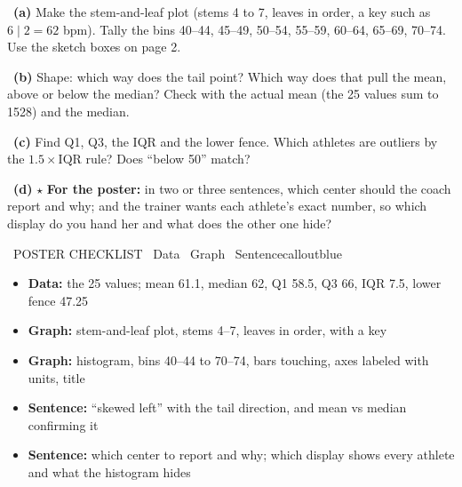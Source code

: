~\textbf{(a)} Make the stem-and-leaf plot (stems 4 to 7, leaves in order, a key such as $6 \mid 2 = 62$ bpm). Tally the bins 40--44, 45--49, 50--54, 55--59, 60--64, 65--69, 70--74. Use the sketch boxes on page 2.
\workspace{1.25in}

~\textbf{(b)} Shape: which way does the tail point? Which way does that pull the mean, above or below the median? Check with the actual mean (the 25 values sum to 1528) and the median.
\workspace{0.8in}

~\textbf{(c)} Find Q1, Q3, the IQR and the lower fence. Which athletes are outliers by the $1.5 \times \text{IQR}$ rule? Does ``below 50'' match?
\workspace{0.6in}

~\textbf{(d)} $\star$ \textbf{For the poster:} in two or three sentences, which center should the coach report and why; and the trainer wants each athlete's exact number, so which display do you hand her and what does the other one hide?
\workspace{0.8in}

\newpage
\begin{callout}{\IconTarget\ POSTER CHECKLIST \textperiodcentered\ Data \textperiodcentered\ Graph \textperiodcentered\ Sentence}{calloutblue}
\begin{itemize}[leftmargin=1.6em,itemsep=1pt,topsep=1pt]
  \item[$\square$] \textbf{Data:} the 25 values; mean 61.1, median 62, Q1 58.5, Q3 66, IQR 7.5, lower fence 47.25
  \item[$\square$] \textbf{Graph:} stem-and-leaf plot, stems 4--7, leaves in order, with a key
  \item[$\square$] \textbf{Graph:} histogram, bins 40--44 to 70--74, bars touching, axes labeled with units, title
  \item[$\square$] \textbf{Sentence:} ``skewed left'' with the tail direction, and mean vs median confirming it
  \item[$\square$] \textbf{Sentence:} which center to report and why; which display shows every athlete and what the histogram hides
\end{itemize}
\posterrule
\end{callout}

